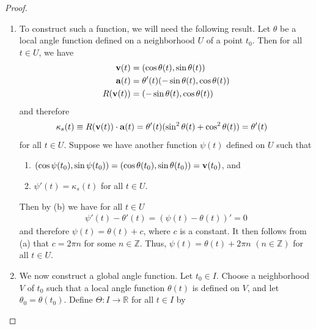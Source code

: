 \documentclass[12pt,letterpaper,reqno]{article}
\numberwithin{equation}{section}
\newcommand{\R}{\ensuremath{\mathbb R}}
\newcommand{\Z}{\ensuremath{\mathbb Z}}
\newcommand{\bv}{{\bf v}}
\newcommand{\ba}{{\bf a}}
\begin{document}
{\begin{proof}
\begin{enumerate}
\begin{itemize}
\begin{align*}
				\theta(t)&=\cos^{-1}(v_x)
			\end{align*}
			\item If $v_x<0$ on $U$, for each $t \in U$ define $\theta:U \to \R$ by
			\begin{align*}
				\theta(t)&=\pi-\tan^{-1}(\frac{v_y}{v_x})
			\end{align*}
			\item If $v_y<0$ on $U$, for each $t \in U$ define $\theta:U \to \R$ by
			\begin{align*}
				\theta(t)&=2\pi-\cos^{-1}(v_x)
			\end{align*}
		\end{itemize}
These are, of course, far from unique. While this shows each point has a neighborhood on which we can define a local angle function, to prove the theorem we need to define a \emph{global angle function}, which is defined on \emph{all} of $I$.
\item To construct such a function, we will need the following result. Let $\theta$ be a local angle function defined on a neighborhood $U$ of a point $t_0$. Then for all $t \in U$, we have
\begin{align*}
	\bv(t)&=(\cos \theta(t),\sin \theta(t)) \\
	\ba(t)&=\theta'(t)(-\sin \theta(t),\cos \theta(t)) \\
	R(\bv(t))&=(-\sin \theta(t),\cos \theta(t))
\end{align*}					
and therefore
\begin{align*}
	\kappa_s(t)&\equiv R(\bv(t)) \cdot \ba(t)=\theta'(t)(\sin^2 \theta(t)+\cos^2\theta(t))=\theta'(t)
\end{align*}
for all $t \in U$. Suppose we have another function $\psi(t)$ defined on $U$ such that 
\begin{enumerate}
	\item $(\cos \psi(t_0), \sin \psi(t_0))=(\cos \theta(t_0), \sin \theta(t_0))=\bv(t_0)$, and 
	\item $\psi'(t)=\kappa_s(t)$ for all $t \in U$.
\end{enumerate}
Then by (b) we have for all $t \in U$
\begin{align*}
	\psi'(t)-\theta'(t)=(\psi(t)-\theta(t))'=0
\end{align*}
and therefore $\psi(t)=\theta(t)+c$, where $c$ is a constant. It then follows from (a) that $c=2\pi n$ for some $n \in \Z$. Thus, $\psi(t)=\theta(t)+2\pi n$ $(n \in \Z)$ for all $t \in U$.
\item We now construct a global angle function. Let $t_0 \in I$. Choose a neighborhood $V$ of $t_0$ such that a local angle function $\theta(t)$ is defined on $V$, and let $\theta_0=\theta(t_0)$. Define $\Theta:I \to \R$ for all $t \in I$ by

\end{enumerate}
\end{proof}}
\end{document}
